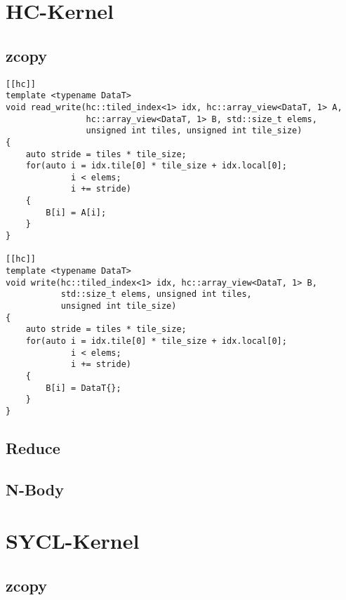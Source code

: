 \section{HC-Kernel}

\subsection{zcopy}

\begin{code}
    \begin{verbatim}
[[hc]]
template <typename DataT>
void read_write(hc::tiled_index<1> idx, hc::array_view<DataT, 1> A,
                hc::array_view<DataT, 1> B, std::size_t elems,
                unsigned int tiles, unsigned int tile_size)
{
    auto stride = tiles * tile_size;
    for(auto i = idx.tile[0] * tile_size + idx.local[0];
             i < elems;
             i += stride)
    {
        B[i] = A[i];
    }
}

[[hc]]
template <typename DataT>
void write(hc::tiled_index<1> idx, hc::array_view<DataT, 1> B,
           std::size_t elems, unsigned int tiles,
           unsigned int tile_size)
{
    auto stride = tiles * tile_size;
    for(auto i = idx.tile[0] * tile_size + idx.local[0];
             i < elems;
             i += stride)
    {
        B[i] = DataT{};
    }
}
    \end{verbatim}
    \caption{zcopy - HC-Implementierung}
    \label{anhang:hc:zcopy}
\end{code}

\subsection{Reduce}
\subsection{N-Body}

\section{SYCL-Kernel}

\subsection{zcopy}

